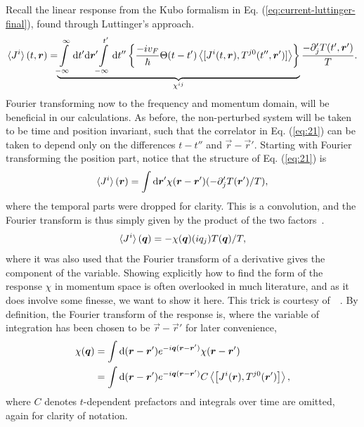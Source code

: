Recall the linear response from the Kubo formalism in Eq. (\ref{eq:current-luttinger-final}), found through Luttinger's approach.
\begin{equation}
  \label{eq:21}
  \braket{J^i}(t, \vec{r}) = \!\!
  \underbrace{
  \int\limits_{-\infty }^{\infty } \mathrm{d}t' \mathrm{d}\vec{r}' \!\!
  \int\limits_{-\infty }^{t'} \mathrm{d}t''
  \left\{
    \frac{-i v_F}{\hbar } \Theta (t-t')
    \Braket{
      [J^i(t, \vec{r}), T^{j 0} (t'', \vec{r}')]
    }
  \right\}
  }_{\chi^{ij}}
  \frac{- \partial _j' T(t', \vec{r}')}{T}.
\end{equation}
Fourier transforming now to the frequency and momentum domain, will be beneficial in our calculations.
As before, the non-perturbed system will be taken to be time and position invariant, such that the correlator in Eq. (\ref{eq:21}) can be taken to depend only on the differences $t-t''$ and $\vec{r} - \vec{r}' $.
Starting with Fourier transforming the position part, notice that the structure of Eq. (\ref{eq:21}) is
\[
  \braket{J^i}(\vec{r}) = \int \mathrm{d} \vec{r}' \chi (\vec{r} - \vec{r}') (-\partial _j' T(\vec{r}') /T),
\]
where the temporal parts were dropped for clarity.
This is a convolution, and the Fourier transform is thus simply given by the product of the two factors~\cite{rottmannMatematiskFormelsamling1995}.
\begin{equation}
  \braket{J^i}(\vec{q}) = -
  \chi (\vec{q}) (iq_j) T(\vec{q}) /T,
\end{equation}
where it was also used that the Fourier transform of a derivative gives the component of the variable.
Showing explicitly how to find the form of the response $\chi $ in momentum space is often overlooked in much literature, and as it does involve some finesse, we want to show it here.
This trick is courtesy of~\citeauthor{changLectureNotesManybody2018}~\cite{changLectureNotesManybody2018}.
By definition, the Fourier transform of the response is, where the variable of integration has been chosen to be $\vec{r}-\vec{r}'$ for later convenience,
\begin{align}
  \chi (\vec{q}) &= \int \mathrm{d}(\vec{r} - \vec{r}') e^{-i\vec{q}(\vec{r}-\vec{r}')} \chi (\vec{r} - \vec{r}')\\
                 &= \int \mathrm{d}(\vec{r} - \vec{r}') e^{-i\vec{q}(\vec{r}-\vec{r}')} C \Braket{
                   \left[
J^i (\vec{r}), T^{j 0}(\vec{r}')
                   \right]},\\
\end{align}
where $C$ denotes $t$-dependent prefactors and integrals over time are omitted, again for clarity of notation.
